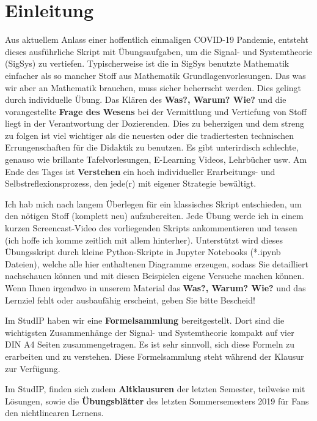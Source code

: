 \newpage
\section*{Einleitung}
%
Aus aktuellem Anlass einer hoffentlich einmaligen COVID-19 Pandemie, entsteht
dieses ausführliche Skript mit Übungsaufgaben, um die Signal- und Systemtheorie
(SigSys) zu vertiefen.
%
Typischerweise ist die in SigSys benutzte Mathematik einfacher als so mancher Stoff
aus Mathematik Grundlagenvorlesungen.
%
Das was wir aber an Mathematik brauchen, muss sicher beherrscht werden.
%
Dies gelingt durch individuelle Übung.
%
Das Klären des \textbf{Was?, Warum? Wie?} und die vorangestellte \textbf{Frage des Wesens}
bei der Vermittlung und Vertiefung von Stoff liegt in der
Verantwortung der Dozierenden.
%
Dies zu beherzigen und dem streng zu folgen ist viel wichtiger als die neuesten
oder die tradiertesten technischen Errungenschaften für die Didaktik zu benutzen.
%
Es gibt unterirdisch schlechte, genauso wie brillante Tafelvorlesungen,
E-Learning Videos, Lehrbücher usw.
%
Am Ende des Tages ist \textbf{Verstehen} ein hoch individueller Erarbeitungs-
und Selbstreflexionsprozess, den jede(r) mit eigener Strategie bewältigt.
%

Ich hab mich nach langem Überlegen für ein klassisches Skript entschieden,
um den nötigen Stoff (komplett neu) aufzubereiten.
%
Jede Übung werde ich in einem kurzen Screencast-Video des vorliegenden Skripts
ankommentieren und teasen (ich hoffe ich komme zeitlich mit allem hinterher).
%
Unterstützt wird dieses Übungsskript durch kleine Python-Skripte in
Jupyter Notebooks (*.ipynb Dateien),
welche alle hier enthaltenen Diagramme erzeugen, sodass Sie
detailliert nachschauen können und mit diesen Beispielen eigene Versuche machen
können.
%
Wenn Ihnen irgendwo in unserem Material das \textbf{Was?, Warum? Wie?} und das
Lernziel fehlt oder ausbaufähig erscheint, geben Sie bitte Bescheid!

Im StudIP haben wir eine \textbf{Formelsammlung} bereitgestellt. Dort sind die
wichtigsten Zusammenhänge der Signal- und Systemtheorie kompakt auf vier DIN A4
Seiten zusammengetragen. Es ist sehr sinnvoll, sich diese Formeln zu erarbeiten
und zu verstehen. Diese Formelsammlung steht während der Klausur zur Verfügung.

Im StudIP, finden sich zudem \textbf{Altklausuren} der letzten Semester,
teilweise mit Lösungen, sowie die \textbf{Übungsblätter} des letzten
Sommersemesters 2019 für Fans den nichtlinearen Lernens.

